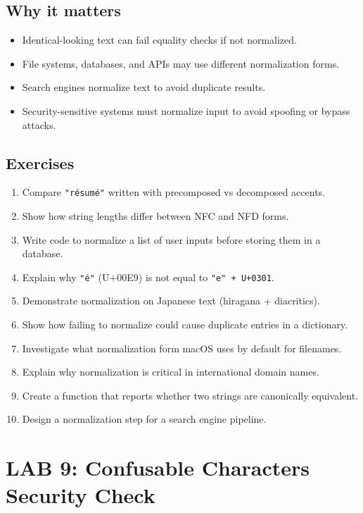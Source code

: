 \documentclass[
  letterpaper,
  DIV=11,
  numbers=noendperiod]{scrreprt}
\providecommand{\tightlist}{%
  \setlength{\itemsep}{0pt}\setlength{\parskip}{0pt}}
\begin{document}
\subsection{Why it matters}\label{why-it-matters-52}

\begin{itemize}
\tightlist
\item
  Identical-looking text can fail equality checks if not normalized.
\item
  File systems, databases, and APIs may use different normalization
  forms.
\item
  Search engines normalize text to avoid duplicate results.
\item
  Security-sensitive systems must normalize input to avoid spoofing or
  bypass attacks.
\end{itemize}

\subsection{Exercises}\label{exercises-51}

\begin{enumerate}
\def\labelenumi{\arabic{enumi}.}
\tightlist
\item
  Compare \texttt{"résumé"} written with precomposed vs decomposed
  accents.
\item
  Show how string lengths differ between NFC and NFD forms.
\item
  Write code to normalize a list of user inputs before storing them in a
  database.
\item
  Explain why \texttt{"é"} (U+00E9) is not equal to
  \texttt{"e"\ +\ U+0301}.
\item
  Demonstrate normalization on Japanese text (hiragana + diacritics).
\item
  Show how failing to normalize could cause duplicate entries in a
  dictionary.
\item
  Investigate what normalization form macOS uses by default for
  filenames.
\item
  Explain why normalization is critical in international domain names.
\item
  Create a function that reports whether two strings are canonically
  equivalent.
\item
  Design a normalization step for a search engine pipeline.
\end{enumerate}

\section{LAB 9: Confusable Characters Security
Check}\label{lab-9-confusable-characters-security-check}
\end{document}
